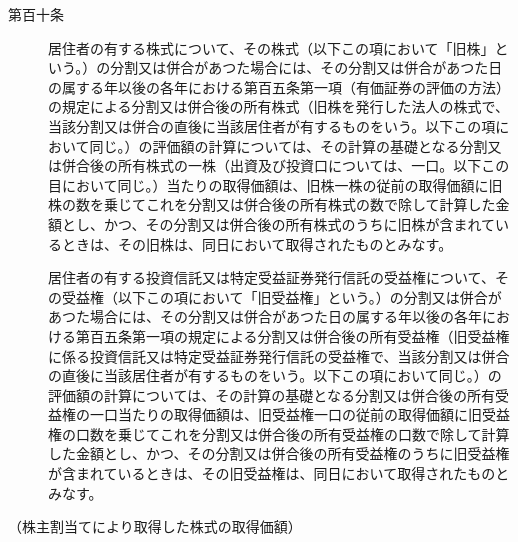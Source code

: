 \documentclass[twocolumn,a4j,10pt]{ltjtarticle}
\begin{document}
\begin{description}
\item[第百十条]居住者の有する株式について、その株式（以下この項において「旧株」という。）の分割又は併合があつた場合には、その分割又は併合があつた日の属する年以後の各年における第百五条第一項（有価証券の評価の方法）の規定による分割又は併合後の所有株式（旧株を発行した法人の株式で、当該分割又は併合の直後に当該居住者が有するものをいう。以下この項において同じ。）の評価額の計算については、その計算の基礎となる分割又は併合後の所有株式の一株（出資及び投資口については、一口。以下この目において同じ。）当たりの取得価額は、旧株一株の従前の取得価額に旧株の数を乗じてこれを分割又は併合後の所有株式の数で除して計算した金額とし、かつ、その分割又は併合後の所有株式のうちに旧株が含まれているときは、その旧株は、同日において取得されたものとみなす。
\item[]居住者の有する投資信託又は特定受益証券発行信託の受益権について、その受益権（以下この項において「旧受益権」という。）の分割又は併合があつた場合には、その分割又は併合があつた日の属する年以後の各年における第百五条第一項の規定による分割又は併合後の所有受益権（旧受益権に係る投資信託又は特定受益証券発行信託の受益権で、当該分割又は併合の直後に当該居住者が有するものをいう。以下この項において同じ。）の評価額の計算については、その計算の基礎となる分割又は併合後の所有受益権の一口当たりの取得価額は、旧受益権一口の従前の取得価額に旧受益権の口数を乗じてこれを分割又は併合後の所有受益権の口数で除して計算した金額とし、かつ、その分割又は併合後の所有受益権のうちに旧受益権が含まれているときは、その旧受益権は、同日において取得されたものとみなす。
\end{description}
\noindent\hspace{10pt}（株主割当てにより取得した株式の取得価額）
\end{document}
